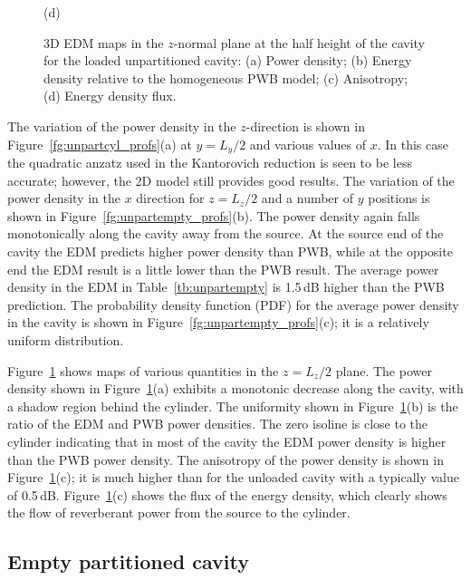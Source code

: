 \documentclass[a4paper]{article}
\numberwithin{equation}{section}
\newcounter{Table}
\newcounter{Figure}
\begin{document}
\begin{figure}[hp]
\begin{center}
{\footnotesize (d)}\\
\vspace{-2mm}
\caption{\label{fg:unpartcyl_maps} 3D EDM maps in the $z$-normal plane at the half height of the cavity for the 
loaded unpartitioned cavity: (a) Power density; (b) Energy density relative to the homogeneous PWB model;
(c) Anisotropy; (d) Energy density flux.}
\end{center}
\end{figure}

The variation of the power density in the $z$-direction is shown in Figure~\ref{fg:unpartcyl_profs}(a)
at $y=L_y/2$ and various values of $x$. In this case the quadratic anzatz used in the Kantorovich reduction
is seen to be less accurate; however, the 2D model still provides good results. The variation of the power density 
in the $x$ direction for $z=L_z/2$ and a number of $y$ positions is shown in Figure~\ref{fg:unpartempty_profs}(b).
The power density again falls monotonically along the cavity away from the source. At the source end of 
the cavity the EDM predicts higher power density than PWB, while 
at the opposite end the EDM result is a little lower than the PWB result. The average power density in the EDM in 
Table~\ref{tb:unpartempty} is 1.5\,dB higher than the PWB prediction. The probability density function (PDF)
for the average power density in the cavity is shown in Figure~\ref{fg:unpartempty_profs}(c); it is a relatively
uniform distribution.

Figure~\ref{fg:unpartcyl_maps} shows maps of various quantities in the $z=L_z/2$ plane. The power density
shown in Figure~\ref{fg:unpartcyl_maps}(a) exhibits a monotonic decrease along the cavity, with a shadow
region behind the cylinder. The uniformity shown in Figure~\ref{fg:unpartcyl_maps}(b)
is the ratio of the EDM and PWB power densities. The zero isoline is close to the cylinder indicating that in most of 
the cavity the EDM power density is higher than the PWB power density. The anisotropy of the power density is shown in
Figure~\ref{fg:unpartcyl_maps}(c); it is much higher than for the unloaded cavity with a typically value of 0.5\,dB.
Figure~\ref{fg:unpartcyl_maps}(c) shows the flux of the energy density, which clearly shows the flow of reverberant power from 
the source to the cylinder. 

\subsection[Empty partitioned cavity]{Empty partitioned cavity}
\label{sc:res:emptypart}
\end{document}
